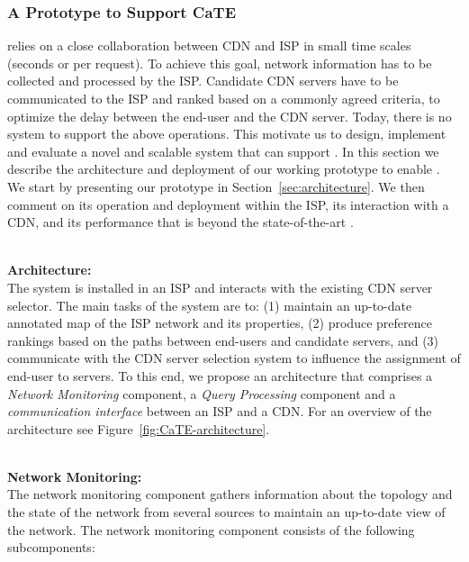 \subsubsection{A Prototype to Support CaTE}\label{sec:system}
\cate relies on a close collaboration between CDN and ISP in small time scales
(seconds or per request).  To achieve this goal, network information has to be
collected and processed by the ISP.  Candidate CDN servers have to be
communicated to the ISP and ranked based on a commonly agreed criteria, \eg to
optimize the delay between the end-user and the CDN server.  Today, there is no
system to support the above operations.  This motivate us to design, implement
and evaluate a novel and scalable system that can support \cate.  In this
section we describe the architecture and deployment of our working prototype to
enable \cate.  We start by presenting our prototype in
Section~\ref{sec:architecture}.  We then  comment on its operation and
deployment within the ISP, its interaction with a CDN, and its performance that
is beyond the state-of-the-art \cite{ietf-alto-protocol}.


\ \\\noindent\textbf{Architecture:}\label{sec:architecture}\\\noindent
The \cate system is installed in an ISP and interacts with the existing CDN
server selector. The main tasks of the \cate system are to: (1) maintain an
up-to-date annotated map of the ISP network and its properties, (2) produce
preference rankings based on the paths between end-users and candidate servers,
and (3) communicate with the CDN server selection system to influence the
assignment of end-user to servers.  To this end, we propose an architecture
that comprises a {\it Network Monitoring} component, a {\it Query Processing}
component and a {\it communication interface} between an ISP and a CDN.  For an
overview of the architecture see Figure~\ref{fig:CaTE-architecture}.


\ \\\noindent\textbf{Network Monitoring:}\label{sec:Network-monitoring}\\\noindent
The network monitoring component gathers information about the topology and the
state of the network from several sources to maintain an up-to-date view of the
network.  The network monitoring component consists of the following
subcomponents:

